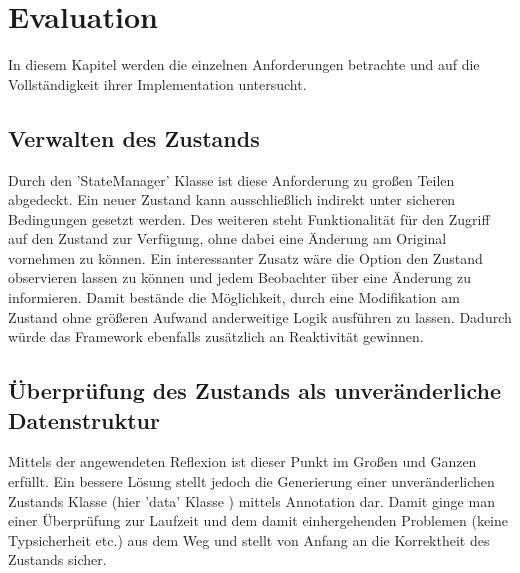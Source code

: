 \section{Evaluation}
\label{sec:evaluation}
In diesem Kapitel werden die einzelnen Anforderungen betrachte und auf die Vollständigkeit ihrer Implementation untersucht.

\subsection{Verwalten des Zustands}
Durch den 'StateManager' Klasse ist diese Anforderung zu großen Teilen abgedeckt. Ein neuer Zustand kann ausschließlich indirekt unter sicheren Bedingungen gesetzt werden. Des weiteren steht Funktionalität für den Zugriff auf den Zustand zur Verfügung, ohne dabei eine Änderung am Original vornehmen zu können. Ein interessanter Zusatz wäre die Option den Zustand observieren lassen zu können und jedem Beobachter über eine Änderung zu informieren. Damit bestände die Möglichkeit, durch eine Modifikation am Zustand ohne größeren Aufwand anderweitige Logik ausführen zu lassen. Dadurch würde das Framework ebenfalls zusätzlich an Reaktivität gewinnen.  

\subsection{Überprüfung des Zustands als unveränderliche Datenstruktur}
Mittels der angewendeten Reflexion ist dieser Punkt im Großen und Ganzen erfüllt. Ein bessere Lösung stellt jedoch die Generierung einer unveränderlichen Zustands Klasse (hier 'data' Klasse ) mittels Annotation dar. Damit ginge man einer Überprüfung zur Laufzeit und dem damit einhergehenden Problemen (keine Typsicherheit etc.) aus dem Weg und stellt von Anfang an die Korrektheit des Zustands sicher. 


